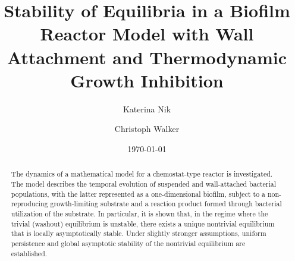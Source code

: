 \documentclass[reqno,11pt]{amsart}
\numberwithin{equation}{section}
\begin{document}

\title[Equilibria in a Biofilm Model]{Stability of Equilibria in a Biofilm Reactor Model with Wall Attachment and Thermodynamic Growth Inhibition}


%
\author{Katerina Nik}
\address{King Abdullah University of Science and Technology (KAUST)\\
CEMSE Division\\
Thuwal 23955-6900\\
Saudi Arabia}

\author{Christoph Walker}
\address{Leibniz Universit\"at Hannover\\
Institut f\"ur Angewandte Mathematik\\
Welfengarten 1\\
30167 Hannover\\
Germany}
%
\date{\today}

\begin{abstract}
The dynamics of a mathematical model for a chemostat-type reactor is investigated. The model describes the temporal evolution of suspended and wall-attached bacterial populations, with the latter represented as a one-dimensional biofilm, subject to a non-reproducing growth-limiting substrate and a reaction product formed through bacterial utilization of the substrate. In particular, it is shown that, in the regime where the trivial (washout) equilibrium is unstable, there exists a unique nontrivial equilibrium that is locally asymptotically stable. Under slightly stronger assumptions, uniform persistence and global asymptotic stability of the nontrivial equilibrium are established.
\end{abstract}
%
\maketitle
\end{document}
